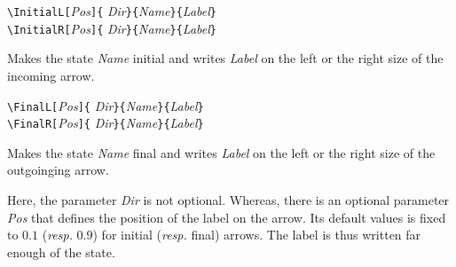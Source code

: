 \documentclass[11pt,twoside]{article}
\newlength{\ColoText}%
\newlength{\ColoFigu}%
\newlength{\parindenttemp} %
\newcommand{\noi}{\noindent}
\newlength{\jsIndent}%
\begin{document}
\medskip 
\noi 
\hspace*{-\jsIndent}
\begin{minipage}[t]{\ColoText}
        \par\vspace*{0mm}%
        \footnotesize
\verb+\InitialL[+\textsl{Pos}\verb+]{+%
   \textsl{Dir}\verb+}{+\textsl{Name}\verb+}{+\textsl{Label}\verb+}+
\\ \verb+\InitialR[+\textsl{Pos}\verb+]{+%
   \textsl{Dir}\verb+}{+\textsl{Name}\verb+}{+\textsl{Label}\verb+}+
\normalsize
\end{minipage}%
\hspace*{1.2em}%
\begin{minipage}[t]{\ColoFigu}%
\par\vspace*{0mm}%
Makes the state \textsl{Name} initial and writes \textsl{Label}
on the left or the right size of the incoming arrow.
\end{minipage}%

\medskip 
\noi 
\hspace*{-\jsIndent}
\begin{minipage}[t]{\ColoText}
        \par\vspace*{0mm}%
        \footnotesize
\verb+\FinalL[+\textsl{Pos}\verb+]{+%
   \textsl{Dir}\verb+}{+\textsl{Name}\verb+}{+\textsl{Label}\verb+}+
\\ \verb+\FinalR[+\textsl{Pos}\verb+]{+%
   \textsl{Dir}\verb+}{+\textsl{Name}\verb+}{+\textsl{Label}\verb+}+
\normalsize
\end{minipage}%
\hspace*{1.2em}%
\begin{minipage}[t]{\ColoFigu}%
\par\vspace*{0mm}%
Makes the state \textsl{Name} final and writes \textsl{Label}
on the left or the right size of the outgoinging arrow.
\end{minipage}%


\medskip 
\noi 
Here, the parameter \textsl{Dir} is not optional. Whereas, there is
an optional parameter \textsl{Pos} that defines the position
of the label on the arrow. Its default values is fixed to $0.1$ ({\it resp.} $0.9$)
for initial ({\it resp.} final) arrows. The label is thus written far enough of the state.
\end{document}
